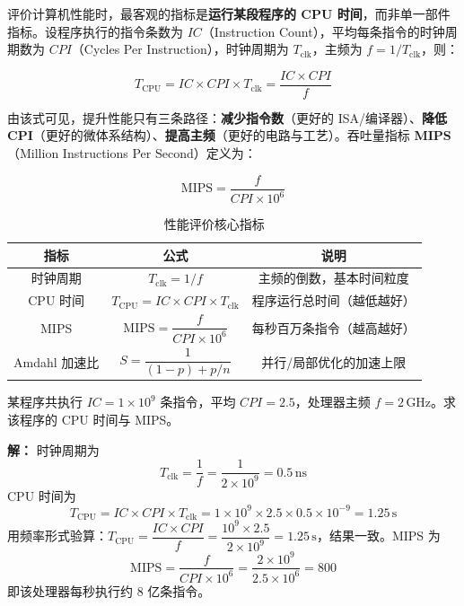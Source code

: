 评价计算机性能时，最客观的指标是\textbf{运行某段程序的 CPU 时间}，而非单一部件指标。设程序执行的指令条数为 $IC$（Instruction Count），平均每条指令的时钟周期数为 $CPI$（Cycles Per Instruction），时钟周期为 $T_{\text{clk}}$，主频为 $f = 1/T_{\text{clk}}$，则：

\begin{equation}
T_{\text{CPU}} = IC \times CPI \times T_{\text{clk}} = \frac{IC \times CPI}{f}
\end{equation}

由该式可见，提升性能只有三条路径：\textbf{减少指令数}（更好的 ISA/编译器）、\textbf{降低 CPI}（更好的微体系结构）、\textbf{提高主频}（更好的电路与工艺）。吞吐量指标 \textbf{MIPS}（Million Instructions Per Second）定义为：

\begin{equation}
\text{MIPS} = \frac{f}{CPI \times 10^6}
\end{equation}

\begin{table}[H]
\centering
\caption{性能评价核心指标}
\label{tab:perf}
\begin{tabulary}{\textwidth}{CCC}
\toprule
\textbf{指标} & \textbf{公式} & \textbf{说明} \\
\midrule
时钟周期 & $T_{\text{clk}} = 1/f$ & 主频的倒数，基本时间粒度 \\
CPU 时间 & $T_{\text{CPU}} = IC \times CPI \times T_{\text{clk}}$ & 程序运行总时间（越低越好） \\
MIPS & $\text{MIPS} = \dfrac{f}{CPI \times 10^6}$ & 每秒百万条指令（越高越好） \\
Amdahl 加速比 & $S = \dfrac{1}{(1-p)+p/n}$ & 并行/局部优化的加速上限 \\
\bottomrule
\end{tabulary}
\end{table}

\begin{example}
某程序共执行 $IC = 1 \times 10^9$ 条指令，平均 $CPI = 2.5$，处理器主频 $f = 2\,\text{GHz}$。求该程序的 CPU 时间与 MIPS。

\textbf{解：} 时钟周期为
\begin{equation}
T_{\text{clk}} = \frac{1}{f} = \frac{1}{2 \times 10^9} = 0.5\,\text{ns}
\end{equation}
CPU 时间为
\begin{equation}
T_{\text{CPU}} = IC \times CPI \times T_{\text{clk}}
= 1 \times 10^9 \times 2.5 \times 0.5 \times 10^{-9} = 1.25\,\text{s}
\end{equation}
用频率形式验算：$T_{\text{CPU}} = \dfrac{IC \times CPI}{f} = \dfrac{10^9 \times 2.5}{2 \times 10^9} = 1.25\,\text{s}$，结果一致。MIPS 为
\begin{equation}
\text{MIPS} = \frac{f}{CPI \times 10^6} = \frac{2 \times 10^9}{2.5 \times 10^6} = 800
\end{equation}
即该处理器每秒执行约 8 亿条指令。
\end{example}

